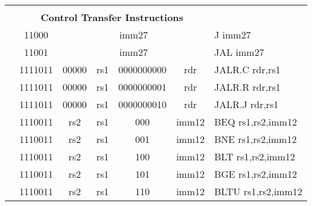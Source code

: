 \begin{table}[p]
\begin{small}
\begin{center}
\begin{tabular}{rcccccccccl}
&
\multicolumn{9}{c}{} & \\
&
\multicolumn{9}{c}{\bf Control Transfer Instructions} & \\
\cline{2-10}
  

&
\multicolumn{1}{|c|}{11000} &
\multicolumn{8}{c|}{imm27} & J imm27 \\
\cline{2-10}
  

&
\multicolumn{1}{|c|}{11001} &
\multicolumn{8}{c|}{imm27} & JAL imm27 \\
\cline{2-10}
  

&
\multicolumn{2}{|c|}{1111011} &
\multicolumn{1}{c|}{00000} &
\multicolumn{1}{c|}{rs1} &
\multicolumn{4}{c|}{0000000000} &
\multicolumn{1}{c|}{rdr} & JALR.C rdr,rs1 \\
\cline{2-10}
  

&
\multicolumn{2}{|c|}{1111011} &
\multicolumn{1}{c|}{00000} &
\multicolumn{1}{c|}{rs1} &
\multicolumn{4}{c|}{0000000001} &
\multicolumn{1}{c|}{rdr} & JALR.R rdr,rs1 \\
\cline{2-10}
  

&
\multicolumn{2}{|c|}{1111011} &
\multicolumn{1}{c|}{00000} &
\multicolumn{1}{c|}{rs1} &
\multicolumn{4}{c|}{0000000010} &
\multicolumn{1}{c|}{rdr} & JALR.J rdr,rs1 \\
\cline{2-10}
  

&
\multicolumn{2}{|c|}{1110011} &
\multicolumn{1}{c|}{rs2} &
\multicolumn{1}{c|}{rs1} &
\multicolumn{1}{c|}{000} &
\multicolumn{4}{c|}{imm12} & BEQ rs1,rs2,imm12 \\
\cline{2-10}
  

&
\multicolumn{2}{|c|}{1110011} &
\multicolumn{1}{c|}{rs2} &
\multicolumn{1}{c|}{rs1} &
\multicolumn{1}{c|}{001} &
\multicolumn{4}{c|}{imm12} & BNE rs1,rs2,imm12 \\
\cline{2-10}
  

&
\multicolumn{2}{|c|}{1110011} &
\multicolumn{1}{c|}{rs2} &
\multicolumn{1}{c|}{rs1} &
\multicolumn{1}{c|}{100} &
\multicolumn{4}{c|}{imm12} & BLT rs1,rs2,imm12 \\
\cline{2-10}
  

&
\multicolumn{2}{|c|}{1110011} &
\multicolumn{1}{c|}{rs2} &
\multicolumn{1}{c|}{rs1} &
\multicolumn{1}{c|}{101} &
\multicolumn{4}{c|}{imm12} & BGE rs1,rs2,imm12 \\
\cline{2-10}
  

&
\multicolumn{2}{|c|}{1110011} &
\multicolumn{1}{c|}{rs2} &
\multicolumn{1}{c|}{rs1} &
\multicolumn{1}{c|}{110} &
\multicolumn{4}{c|}{imm12} & BLTU rs1,rs2,imm12 \\
\cline{2-10}
  


\end{tabular}
\end{center}
\end{small}
\end{table}
